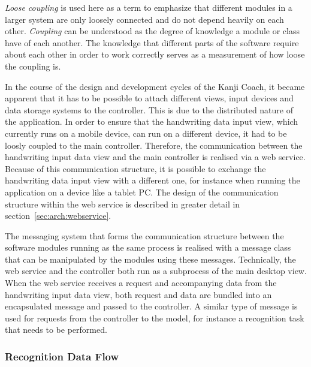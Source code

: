 \emph{Loose coupling} is used here as a term to emphasize that different modules 
in a larger system are only loosely connected and do not depend heavily on each 
other. \emph{Coupling} can be understood as the degree of knowledge a module or 
class have of each another. The knowledge that different parts of the software
require about each other in order to work correctly serves as a measurement of
how loose the coupling is.

In the course of the design and development cycles of the Kanji Coach, 
it became apparent that it has to be possible to attach different views, 
input devices and data storage systems to the controller. This is due to the 
distributed nature of the application. 
In order to ensure that the handwriting data input view, which currently runs 
on a mobile device, can run on a different device, it had to be loosly coupled 
to the main controller. Therefore, the communication between the handwriting 
input data view and the main controller is realised via a web service. 
Because of this communication structure, it is possible to exchange the 
handwriting data input view with a different one, for instance when running 
the application on a device like a tablet PC. The design of the communication 
structure within the web service is described in greater detail 
in section~\ref{sec:arch:webservice}.

The messaging system that forms the communication structure between the software 
modules running as the same process is realised with a message class that
can be manipulated by the modules using these messages.
Technically, the web service and the controller both run as a subprocess of the 
main desktop view. When the web service receives a request and accompanying data
from the handwriting input data view, both request and data are bundled into an 
encapsulated message and passed to the controller. A similar type of message 
is used for requests from the controller to the model, for instance a recognition
task that needs to be performed.



\subsubsection{Recognition Data Flow}
\label{sec:arch:recognitiondataflow}

